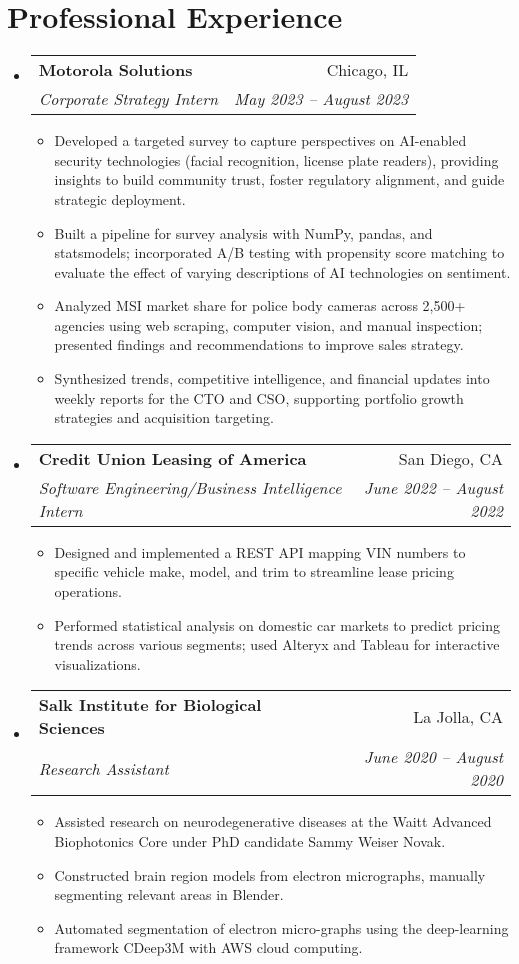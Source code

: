 \documentclass[a4paper,12pt]{article}
\makeatletter
\newcommand{\resumeSubheading}[4]{
  \item[]
    \begin{tabular*}{\textwidth}{l@{\extracolsep{\fill}}r}
      \textbf{#1} & #2 \\
      \textit{#3} & \textit{#4} \\
    \end{tabular*}
}
\newcommand{\resumeSubHeadingListStart}{\begin{itemize}[leftmargin=0in]}
\newcommand{\resumeSubHeadingListEnd}{\end{itemize}}
\makeatother
\begin{document}
\section{Professional Experience}
\resumeSubHeadingListStart
\vspace{0.2cm}
\resumeSubheading{Motorola Solutions}{Chicago, IL}{Corporate Strategy Intern}{May 2023 – August 2023}
    \begin{itemize}[noitemsep,topsep=0pt,leftmargin=*,itemsep=0.05cm]
        \item Developed a targeted survey to capture perspectives on AI-enabled security technologies (facial recognition, license plate readers), providing insights to build community trust, foster regulatory alignment, and guide strategic deployment.
        \item Built a pipeline for survey analysis with NumPy, pandas, and statsmodels; incorporated A/B testing with propensity score matching to evaluate the effect of varying descriptions of AI technologies on sentiment.
        \item Analyzed MSI market share for police body cameras across 2,500+ agencies using web scraping, computer vision, and manual inspection; presented findings and recommendations to improve sales strategy.
        \item Synthesized trends, competitive intelligence, and financial updates into weekly reports for the CTO and CSO, supporting portfolio growth strategies and acquisition targeting.
    \end{itemize}

\resumeSubheading{Credit Union Leasing of America}{San Diego, CA}{Software Engineering/Business Intelligence Intern}{June 2022 – August 2022}
    \begin{itemize}[noitemsep,topsep=0pt,leftmargin=*,itemsep=0.07cm]
        \item Designed and implemented a REST API mapping VIN numbers to specific vehicle make, model, and trim to streamline lease pricing operations.
        \item Performed statistical analysis on domestic car markets to predict pricing trends across various segments; used Alteryx and Tableau for interactive visualizations.
    \end{itemize}

\resumeSubheading{Salk Institute for Biological Sciences}{La Jolla, CA}
    {Research Assistant}{June 2020 – August 2020}
    \begin{itemize}[noitemsep,topsep=0pt,leftmargin=*,itemsep=0.07cm]
        \item Assisted research on neurodegenerative diseases at the Waitt Advanced Biophotonics Core under PhD candidate Sammy Weiser Novak.
        \item Constructed brain region models from electron micrographs, manually segmenting relevant areas in Blender.
        \item Automated segmentation of electron micro-graphs using the deep-learning framework CDeep3M with AWS cloud computing.
    \end{itemize}
\resumeSubHeadingListEnd
\end{document}
